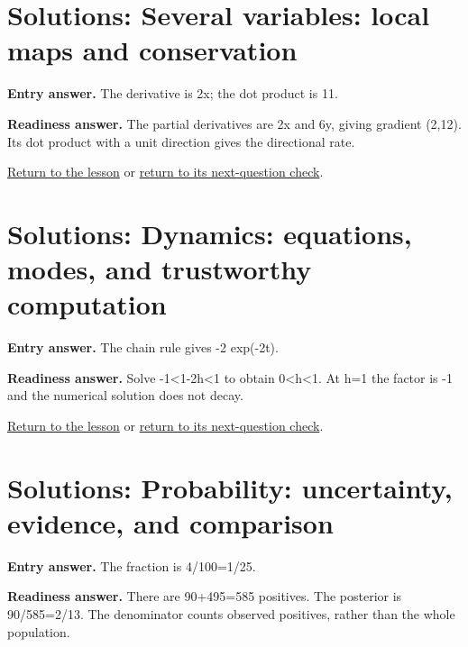 \section{Solutions: Several variables: local maps and conservation}

\label{solution:entry:multivariable}

\textbf{Entry answer.} The derivative is 2x; the dot product is 11.\par

\label{solution:ready:multivariable}

\textbf{Readiness answer.} The partial derivatives are 2x and 6y, giving gradient (2,12). Its dot product with a unit direction gives the directional rate.\par

\hyperref[learn:multivariable]{Return to the lesson} or \hyperref[readiness:multivariable]{return to its next-question check}.

\section{Solutions: Dynamics: equations, modes, and trustworthy computation}

\label{solution:entry:dynamics}

\textbf{Entry answer.} The chain rule gives -2 exp(-2t).\par

\label{solution:ready:dynamics}

\textbf{Readiness answer.} Solve -1\textless{}1-2h\textless{}1 to obtain 0\textless{}h\textless{}1. At h=1 the factor is -1 and the numerical solution does not decay.\par

\hyperref[learn:dynamics]{Return to the lesson} or \hyperref[readiness:dynamics]{return to its next-question check}.

\section{Solutions: Probability: uncertainty, evidence, and comparison}

\label{solution:entry:probability}

\textbf{Entry answer.} The fraction is 4/100=1/25.\par

\label{solution:ready:probability}

\textbf{Readiness answer.} There are 90+495=585 positives. The posterior is 90/585=2/13. The denominator counts observed positives, rather than the whole population.\par

